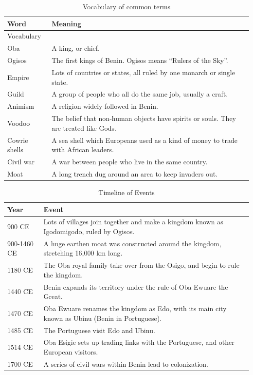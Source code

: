 \begin{table}[htb]
\centering
\caption{Vocabulary of common terms}
\label{tab:vocabulary}
\begin{tabularx}{\linewidth}{|l|X|}
\hline
\textbf{Word} & \textbf{Meaning} \\
\hline
Vocabulary & \\
\hline
Oba & A king, or chief. \\
\hline
Ogisos & The first kings of Benin. Ogisos means “Rulers of the Sky”. \\
\hline
Empire & Lots of countries or states, all ruled by one monarch or single state. \\
\hline
Guild & A group of people who all do the same job, usually a craft. \\
\hline
Animism & A religion widely followed in Benin. \\
\hline
Voodoo & The belief that non-human objects have spirits or souls. They are treated like Gods. \\
\hline
Cowrie shells & A sea shell which Europeans used as a kind of money to trade with African leaders. \\
\hline
Civil war & A war between people who live in the same country. \\
\hline
Moat & A long trench dug around an area to keep invaders out. \\
\hline
\end{tabularx}
\end{table}

\begin{table}[htb]
\centering
\caption{Timeline of Events}
\label{tab:timeline}
\begin{tabularx}{\linewidth}{|l|X|}
\hline
\textbf{Year} & \textbf{Event} \\
\hline
900 CE & Lots of villages join together and make a kingdom known as Igodomigodo, ruled by Ogisos. \\
\hline
900-1460 CE & A huge earthen moat was constructed around the kingdom, stretching 16,000 km long. \\
\hline
1180 CE & The Oba royal family take over from the Osigo, and begin to rule the kingdom. \\
\hline
1440 CE & Benin expands its territory under the rule of Oba Ewuare the Great. \\
\hline
1470 CE & Oba Ewuare renames the kingdom as Edo, with its main city known as Ubinu (Benin in Portuguese). \\
\hline
1485 CE & The Portuguese visit Edo and Ubinu. \\
\hline
1514 CE & Oba Esigie sets up trading links with the Portuguese, and other European visitors. \\
\hline
1700 CE & A series of civil wars within Benin lead to colonization. \\
\hline
\end{tabularx}
\end{table}


